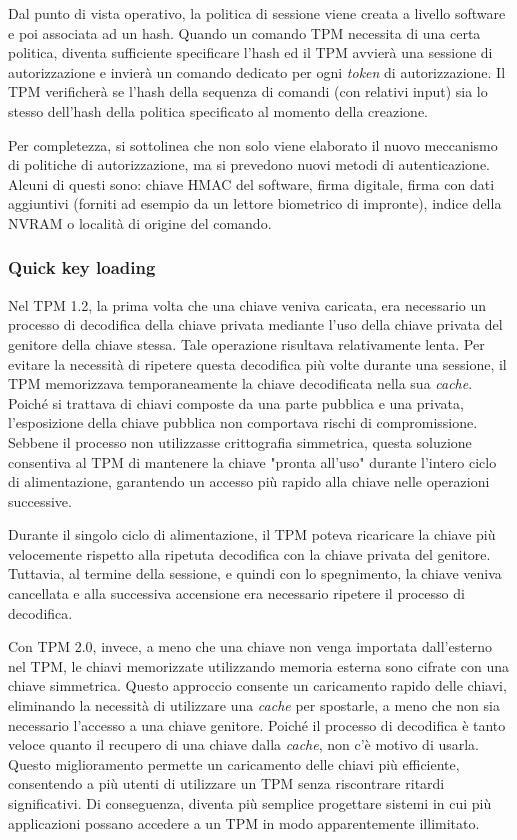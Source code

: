 Dal punto di vista operativo, la politica di sessione viene creata a livello software e poi associata ad un hash. Quando un comando TPM necessita di una certa politica, diventa sufficiente specificare l’hash ed il TPM avvierà una sessione di autorizzazione e invierà un comando dedicato per ogni \textit{token} di autorizzazione. Il TPM verificherà se l’hash della sequenza di comandi (con relativi input) sia lo stesso dell'hash della politica specificato al momento della creazione.

Per completezza, si sottolinea che non solo viene elaborato il nuovo meccanismo di politiche di autorizzazione, ma si prevedono nuovi metodi di autenticazione. Alcuni di questi sono: chiave HMAC del software, firma digitale, firma con dati aggiuntivi (forniti ad esempio da un lettore biometrico di impronte), indice della NVRAM o località di origine del comando.

\subsubsection{Quick key loading}
Nel TPM 1.2, la prima volta che una chiave veniva caricata, era necessario un processo di decodifica della chiave privata mediante l'uso della chiave privata del genitore della chiave stessa. Tale operazione risultava relativamente lenta. Per evitare la necessità di ripetere questa decodifica più volte durante una sessione, il TPM memorizzava temporaneamente la chiave decodificata nella sua \textit{cache}. Poiché si trattava di chiavi composte da una parte pubblica e una privata, l'esposizione della chiave pubblica non comportava rischi di compromissione. Sebbene il processo non utilizzasse crittografia simmetrica, questa soluzione consentiva al TPM di mantenere la chiave "pronta all'uso" durante l'intero ciclo di alimentazione, garantendo un accesso più rapido alla chiave nelle operazioni successive.

Durante il singolo ciclo di alimentazione, il TPM poteva ricaricare la chiave più velocemente rispetto alla ripetuta decodifica con la chiave privata del genitore. Tuttavia, al termine della sessione, e quindi con lo spegnimento, la chiave veniva cancellata e alla successiva accensione era necessario ripetere il processo di decodifica.

Con TPM 2.0, invece, a meno che una chiave non venga importata dall'esterno nel TPM, le chiavi memorizzate utilizzando memoria esterna sono cifrate con una chiave simmetrica. Questo approccio consente un caricamento rapido delle chiavi, eliminando la necessità di utilizzare una \textit{cache} per spostarle, a meno che non sia necessario l'accesso a una chiave genitore. Poiché il processo di decodifica è tanto veloce quanto il recupero di una chiave dalla \textit{cache}, non c'è motivo di usarla. Questo miglioramento permette un caricamento delle chiavi più efficiente, consentendo a più utenti di utilizzare un TPM senza riscontrare ritardi significativi. Di conseguenza, diventa più semplice progettare sistemi in cui più applicazioni possano accedere a un TPM in modo apparentemente illimitato.

